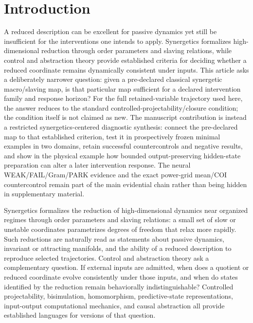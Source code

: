 \section{Introduction}

A reduced description can be excellent for passive dynamics yet still be insufficient for the interventions one intends to apply. Synergetics formalizes high-dimensional reduction through order parameters and slaving relations, while control and abstraction theory provide established criteria for deciding whether a reduced coordinate remains dynamically consistent under inputs.\cite{Haken1996,TabuadaPappas2005,GirardPappas2007} This article asks a deliberately narrower question: given a pre-declared classical synergetic macro/slaving map, is that particular map sufficient for a declared intervention family and response horizon? For the full retained-variable trajectory used here, the answer reduces to the standard controlled-projectability/closure condition; the condition itself is not claimed as new. The manuscript contribution is instead a restricted synergetics-centered diagnostic synthesis: connect the pre-declared map to that established criterion, test it in prospectively frozen minimal examples in two domains, retain successful countercontrols and negative results, and show in the physical example how bounded output-preserving hidden-state preparation can alter a later intervention response. The neural WEAK/FAIL/Gram/PARK evidence and the exact power-grid mean/COI countercontrol remain part of the main evidential chain rather than being hidden in supplementary material.

Synergetics formalizes the reduction of high-dimensional dynamics near organized regimes through order parameters and slaving relations: a small set of slow or unstable coordinates parametrizes degrees of freedom that relax more rapidly.\cite{Haken1996} Such reductions are naturally read as statements about passive dynamics, invariant or attracting manifolds, and the ability of a reduced description to reproduce selected trajectories. Control and abstraction theory ask a complementary question. If external inputs are admitted, when does a quotient or reduced coordinate evolve consistently under those inputs, and when do states identified by the reduction remain behaviorally indistinguishable? Controlled projectability, bisimulation, homomorphism, predictive-state representations, input-output computational mechanics, and causal abstraction all provide established languages for versions of that question.\cite{TabuadaPappas2005,Littman2001,Givan2003,RavindranBarto2003,BarnettCrutchfield2015,GirardPappas2007,Chalupka2015,Chalupka2016,Rubenstein2017,BeckersHalpern2019,LiKabaRavanbakhsh2025,XiaBareinboim2025,Geiger2025}

